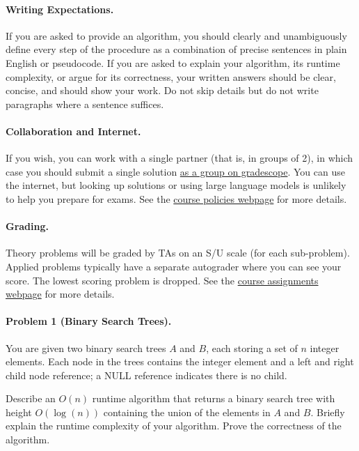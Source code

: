 \documentclass[11pt]{article}
\begin{document}
\paragraph{Writing Expectations.} If you are asked to provide an algorithm, you should clearly and unambiguously define every step of the procedure as a combination of precise sentences in plain English or pseudocode. If you are asked to explain your algorithm, its runtime complexity, or argue for its correctness, your written answers should be clear, concise, and should show your work. Do not skip details but do not write paragraphs where a sentence suffices.

\paragraph{Collaboration and Internet.} If you wish, you can work with a single partner (that is, in groups of 2), in which case you should submit a single solution \href{https://help.gradescope.com/article/m5qz2xsnjy-student-add-group-members}{as a group on gradescope}. You can use the internet, but looking up solutions or using large language models is unlikely to help you prepare for exams. See the \href{https://sites.duke.edu/spring24compsci330/policies/}{course policies webpage} for more details.

\paragraph{Grading.} Theory problems will be graded by TAs on an S/U scale (for each sub-problem). Applied problems typically have a separate autograder where you can see your score. The lowest scoring problem is dropped. See the \href{https://sites.duke.edu/spring24compsci330/assignments/}{course assignments webpage} for more details.




\newpage
\paragraph{Problem 1 (Binary Search Trees).} You are given two binary search trees $A$ and $B$, each storing a set of $n$ integer elements. Each node in the trees contains the integer element and a left and right child node reference; a NULL reference indicates there is no child.

Describe an $O(n)$ runtime algorithm that returns a binary search tree with height $O(\log(n))$ containing the union of the elements in $A$ and $B$. Briefly explain the runtime complexity of your algorithm. Prove the correctness of the algorithm.  
\end{document}
